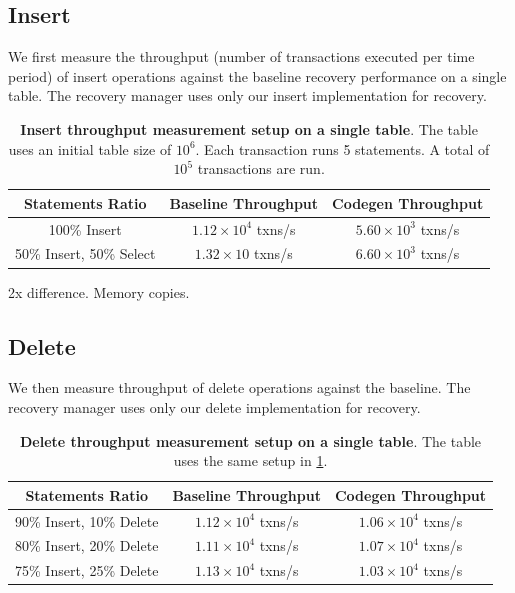 \documentclass[12pt]{cmuthesis}
\begin{document}
\subsection{Insert}
We first measure the throughput (number of transactions executed per time period) of insert operations against the baseline recovery performance on a single table. The recovery manager uses only our insert implementation for recovery.
\begin{table}[H]
\begin{center}
\begin{tabular}{ |c|c|c| } 
 \hline
Statements Ratio & \textbf{Baseline Throughput} & \textbf{Codegen Throughput}\\ 
 \hline
 100\% Insert & $1.12 \times 10^4$ txns/s & $5.60 \times 10^3$ txns/s\\
 \hline
 50\% Insert, 50\% Select & $1.32 \times 10$ txns/s & $6.60 \times 10^3$ txns/s \\ 
 \hline
\end{tabular}
\caption{\textbf{Insert throughput measurement setup on a single table}. The table uses an initial table size of $10^6$. Each transaction runs 5 statements. A total of $10^5$ transactions are run.}
\label{tab:throughput_exp_insert}
\end{center}
\end{table}

2x difference. Memory copies.

\subsection{Delete}
We then measure throughput of delete operations against the baseline. The recovery manager uses only our delete implementation for recovery.
\begin{table}[H]
\begin{center}
\begin{tabular}{ |c|c|c| } 
 \hline
Statements Ratio & \textbf{Baseline Throughput} & \textbf{Codegen Throughput}\\
 \hline
 90\% Insert, 10\% Delete & $1.12 \times 10^4$ txns/s & $1.06 \times 10^4$ txns/s \\ 
 \hline
 80\% Insert, 20\% Delete & $1.11 \times 10^4$ txns/s & $1.07 \times 10^4$ txns/s\\
  \hline
 75\% Insert, 25\% Delete & $1.13 \times 10^4$ txns/s & $1.03 \times 10^4$ txns/s\\
 \hline
\end{tabular}
\caption{\textbf{Delete throughput measurement setup on a single table}. The table uses the same setup in \ref{tab:throughput_exp_insert}.}
\label{tab:throughput_exp_delete}
\end{center}
\end{table}
\end{document}
